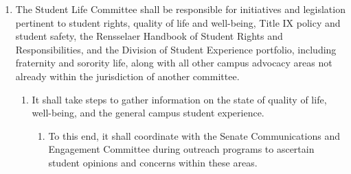 \begin{enumerate}
\begin{enumerate}
\begin{enumerate}
    \end{enumerate}
  \item It shall take steps to remedy student concerns regarding campus dining and housing.
    \begin{enumerate}
    \item It shall meet with Hospitality Services,Residential Life, and Off-Campus Commons on a regular basis, at a time and place coordinated between the Committee Chair and relevant administrators.
    \item It shall pursue, research, and propose dining programs that align with student needs, along with any reforms to residential life that are necessary and proper.
    \item It shall collaborate with Hospitality Services, Residential Life, Off-Campus Commons, and other organizations to initiate solutions to student concerns regarding Rensselaer dining services and on-campus living.
    \end{enumerate}
  \item It shall attempt to maintain a diverse membership that represents a wide range of demographics with regards to residential life and campus dining.
  \item It shall attempt to maintain contact with Residential Assistants and Learning Assistants on campus, and to hear their concerns and to recommend policy to the Senate and relevant administrators as may be applicable.
  \end{enumerate}
\item The Student Life Committee shall be responsible for initiatives and legislation pertinent to student rights, quality of life and well-being, Title IX policy and student safety, the Rensselaer Handbook of Student Rights and Responsibilities, and the Division of Student Experience portfolio, including fraternity and sorority life, along with all other campus advocacy areas not already within the jurisdiction of another committee.
  \begin{enumerate}
  \item It shall take steps to gather information on the state of quality of life, well-being, and the general campus student experience.
    \begin{enumerate}
    \item To this end, it shall coordinate with the Senate Communications and Engagement Committee during outreach programs to ascertain student opinions and concerns within these areas.
    \end{enumerate}

\end{enumerate}
\end{enumerate}
